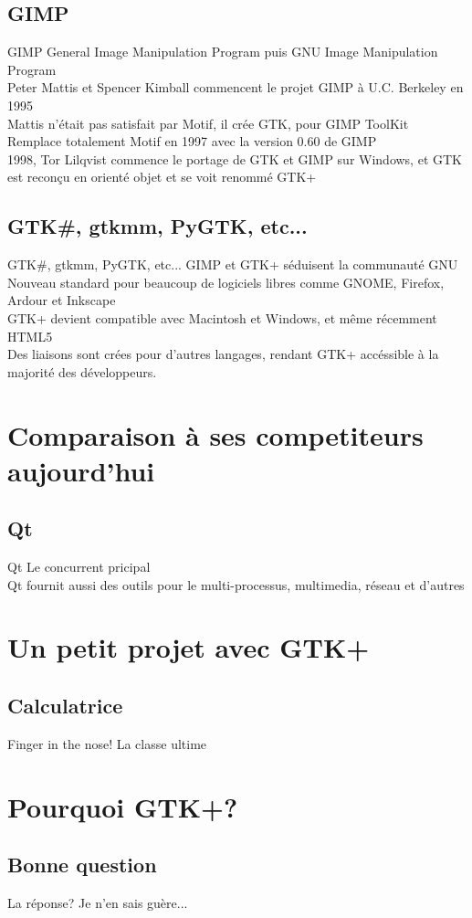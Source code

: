 \documentclass{beamer}
\begin{document}
  \subsection{GIMP}
  \begin{frame}{GIMP}
    General Image Manipulation Program puis GNU Image Manipulation Program\\
    Peter Mattis et Spencer Kimball commencent le projet GIMP à U.C. Berkeley en 1995\\
    Mattis n'était pas satisfait par Motif, il crée GTK, pour GIMP ToolKit\\
    Remplace totalement Motif en 1997 avec la version 0.60 de GIMP\\
    1998, Tor Lilqvist commence le portage de GTK et GIMP sur Windows, et GTK est reconçu en orienté objet et se voit renommé GTK+
  \end{frame}

  \subsection{GTK\#, gtkmm, PyGTK, etc...}
  \begin{frame}{GTK\#, gtkmm, PyGTK, etc...}
    GIMP et GTK+ séduisent la communauté GNU\\
    Nouveau standard pour beaucoup de logiciels libres comme GNOME, Firefox, Ardour et Inkscape\\
    GTK+ devient compatible avec Macintosh et Windows, et même récemment HTML5\\
    Des liaisons sont crées pour d'autres langages, rendant GTK+ accéssible à la majorité des développeurs.
  \end{frame}


  \section{Comparaison à ses competiteurs aujourd'hui}
  \subsection{Qt}
  \begin{frame}{Qt}
    Le concurrent pricipal\\
    Qt fournit aussi des outils pour le multi-processus, multimedia, réseau et d'autres\\

  \end{frame}

  \section{Un petit projet avec GTK+}
  \subsection{Calculatrice}
  \begin{frame}{Finger in the nose!}
    La classe ultime
  \end{frame}


  \section{Pourquoi GTK+?}
  \subsection{Bonne question}
  \begin{frame}{La réponse?}
    Je n'en sais guère...
  \end{frame}
\end{document}
